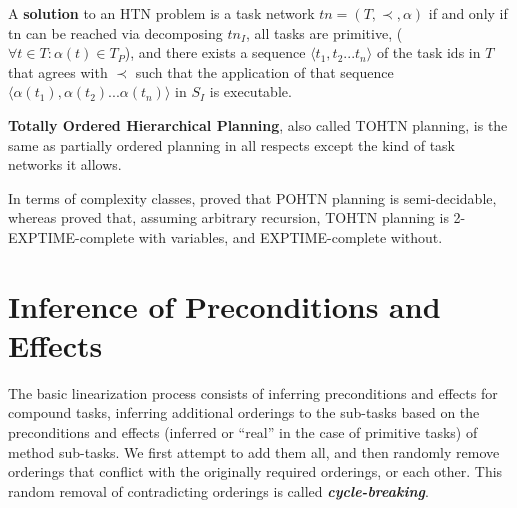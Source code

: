 \documentclass[letterpaper]{article} %
\begin{document}
A \textbf{solution} to an HTN problem is a task network $tn = (T, \prec, \alpha)$ if and only if
tn can be reached via decomposing $tn_I$, all tasks are primitive, ($\forall t \in T: \alpha(t) \in T_P$), and there exists a sequence $\langle t_1, t_2 ... t_n \rangle$ of the task ids in $T$ that agrees with $\prec$ such that the application of that sequence $\langle \alpha(t_1), \alpha(t_2) ... \alpha(t_n) \rangle$ in $S_I$ is executable.



\textbf{Totally Ordered Hierarchical Planning}, also called TOHTN planning, is the same as partially ordered planning in all respects except the kind of task networks it allows.

In terms of complexity classes, \cite{ErolHTNExpressivity} proved that POHTN planning is semi-decidable, whereas \cite{Alford2015TightHTNBounds} proved that, assuming arbitrary recursion, TOHTN planning is 2-EXPTIME-complete with variables, and EXPTIME-complete without. 


\section{Inference of Preconditions and Effects}
The basic linearization process consists of inferring preconditions and effects for compound tasks, inferring additional orderings to the sub-tasks based on the preconditions and effects (inferred or \enquote{real} in the case of primitive tasks) of method sub-tasks. We first attempt to add them all, and then randomly remove orderings that conflict with the originally required orderings, or each other. This random removal of contradicting orderings is called \textbf{\textit{cycle-breaking}}.
 
\end{document}
